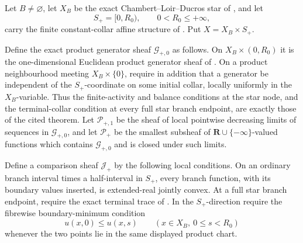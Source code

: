 
\begin{theorem}
\label{thm:p071-infinite-star-finite-collar-product-collapse}
Let $B\ne\varnothing$, let $X_B$ be the exact
Chambert--Loir--Ducros star of
, and let
\[
                  S_+=[0,R_0),\qquad 0<R_0\leq+\infty,
\]
carry the finite constant-collar affine structure of
.  Put
$X=X_B\times S_+$.

Define the exact product generator sheaf $\mathcal G_{+,0}$ as follows.
On $X_B\times(0,R_0)$ it is the one-dimensional Euclidean product
generator sheaf of
.  On a product
neighbourhood meeting $X_B\times\{0\}$, require in addition that a
generator be independent of the $S_+$-coordinate on some initial collar,
locally uniformly in the $X_B$-variable.  Thus the finite-activity and
balance conditions at the star node, and the terminal-collar condition at
every full star branch endpoint, are exactly those of the cited theorem.
Let $\mathcal P_{+,1}$ be the sheaf of local pointwise decreasing limits
of sequences in $\mathcal G_{+,0}$, and let $\mathcal P_+$ be the smallest
subsheaf of $\mathbf R\cup\{-\infty\}$-valued functions which contains
$\mathcal G_{+,0}$ and is closed under such limits.

Define a comparison sheaf $\mathcal J_+$ by the following local
conditions.  On an ordinary branch interval times a half-interval in
$S_+$, every branch function, with its boundary values inserted, is
extended-real jointly convex.  At a full star branch endpoint, require the
exact terminal trace of
.  In the $S_+$-direction
require the fibrewise boundary-minimum condition
\begin{equation}
                    u(x,0)\leq u(x,s)
       \qquad(x\in X_B,\ 0\leq s<R_0)
\label{eq:p071-star-finite-collar-boundary-minimum}
\end{equation}
whenever the two points lie in the same displayed product chart.


\end{theorem}
